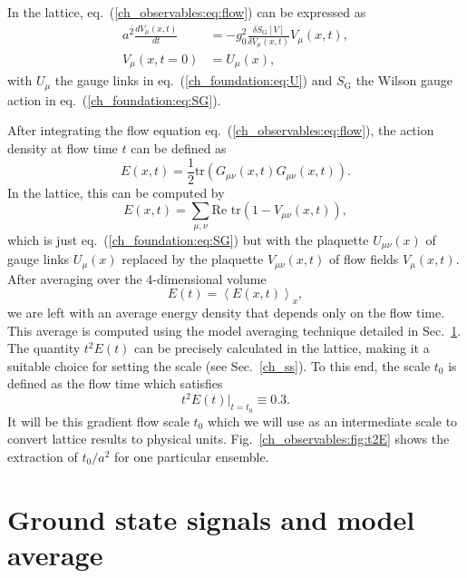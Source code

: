 In the lattice, eq.~(\ref{ch_observables:eq:flow}) can be expressed as 
\begin{align}
a^2\frac{dV_{\mu}(x,t)}{dt}&=-g_0^2\frac{\delta S_{\textrm{G}}[V]}{\delta V_{\mu}(x,t)}V_{\mu}(x,t),\\
V_{\mu}(x,t=0)&=U_{\mu}(x),
\end{align}
with $U_{\mu}$ the gauge links in eq.~(\ref{ch_foundation:eq:U}) and $S_{\textrm{G}}$ the Wilson gauge action in eq.~(\ref{ch_foundation:eq:SG}).

After integrating the flow equation eq.~(\ref{ch_observables:eq:flow}), the action density at flow time $t$ can be defined as
\begin{equation}
E(x,t)=\frac{1}{2}{\textrm{tr}}\left({G}_{\mu\nu}(x,t){G}_{\mu\nu}(x,t)\right).
\end{equation}
In the lattice, this can be computed by
\begin{equation}
\label{ch_observables:eq:E}
E(x,t)=\sum_{\mu,\nu}\textrm{Re tr}\left(1-V_{\mu\nu}(x,t)\right),
\end{equation}
which is just eq.~(\ref{ch_foundation:eq:SG}) but with the plaquette $U_{\mu\nu}(x)$ of gauge links $U_{\mu}(x)$ replaced by the plaquette $V_{\mu\nu}(x,t)$ of flow fields $V_{\mu}(x,t)$. After averaging over the 4-dimensional volume
\begin{equation}
E(t)=\left<E(x,t)\right>_x,
\end{equation}
we are left with an average energy density that depends only on the flow time. This average is computed using the model averaging technique detailed in Sec.~\ref{ch_observables:sec:MA}. The quantity $t^2E(t)$ can be precisely calculated in the lattice, making it a suitable choice for setting the scale (see Sec.~\ref{ch_ss}). To this end, the scale $t_0$ is defined as the flow time which satisfies
\begin{equation}
\label{ch_observables:eq:t0}
t^2E(t)|_{t=t_0}\equiv0.3.
\end{equation}
It will be this gradient flow scale $t_0$ which we will use as an intermediate scale to convert lattice results to physical units. Fig.~\ref{ch_observables:fig:t2E} shows the extraction of $t_0/a^2$ for one particular ensemble.



\section{Ground state signals and model average}
\label{ch_observables:sec:MA}

